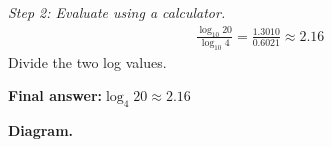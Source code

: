 \documentclass[11pt]{article}
\begin{document}
\textit{Step 2: Evaluate using a calculator.}
\[\begin{gathered}
\frac{\log_{10} 20}{\log_{10} 4} = \frac{1.3010}{0.6021} \approx 2.16
\end{gathered}\]
Divide the two log values.

\begin{answerbox}
\textbf{Final answer:}\quad \(\displaystyle  \log_4 20 \approx 2.16 \)
\end{answerbox}
\textbf{Diagram.}

\begin{center}
\end{center}
\end{document}
